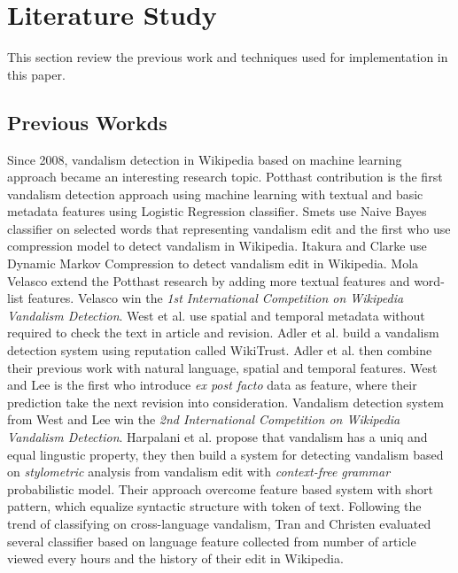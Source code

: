 \documentclass[conference,compsoc,a4paper,twocolumn,final]{IEEEtran}
\begin{document}

\section{Literature Study}
\label{section:literature_study}

This section review the previous work and techniques used for implementation in
this paper.

\subsection{Previous Workds}

Since 2008, vandalism detection in Wikipedia based on machine learning approach
became an interesting research topic.
Potthast \cite{potthast2008automatic} contribution is the first vandalism
detection approach using machine learning with textual and basic
metadata features using Logistic Regression classifier.
Smets \cite{smets08automaticvandalism} use Naive Bayes classifier on selected
words that representing vandalism edit and the first who use compression model
to detect vandalism in Wikipedia.
Itakura and Clarke \cite{itakura2009using} use Dynamic Markov Compression to
detect vandalism edit in Wikipedia.
Mola Velasco \cite{mola2012wikipedia} extend the Potthast research by adding
more textual features and word-list features.
Velasco win the \textit{1st International Competition on Wikipedia Vandalism
Detection}.
West et al. \cite{west2011multilingual} use spatial and temporal metadata
without required to check the text in article and revision.
Adler et al. \cite{adler2011wikipedia} build a vandalism detection system using
reputation called WikiTrust.
Adler et al. \cite{adler2011wikipedia} then combine their previous work with
natural language, spatial and temporal features.
West and Lee \cite{west2011multilingual} is the first who introduce
\textit{ex post facto} data as feature, where their prediction take the next
revision into consideration.
Vandalism detection system from West and Lee win the \textit{2nd International
Competition on Wikipedia Vandalism Detection}.
Harpalani et al. \cite{harpalani2011language} propose that vandalism has
a uniq and equal lingustic property, they then build a system for detecting
vandalism based on \textit{stylometric} analysis from vandalism edit with
\textit{context-free grammar} probabilistic model.
Their approach overcome feature based system with short pattern, which equalize
syntactic structure with token of text.
Following the trend of classifying on cross-language vandalism, Tran and
Christen \cite{tran2013cross} evaluated several classifier based on
language feature collected from number of article viewed every hours and the
history of their edit in Wikipedia.
\end{document}
